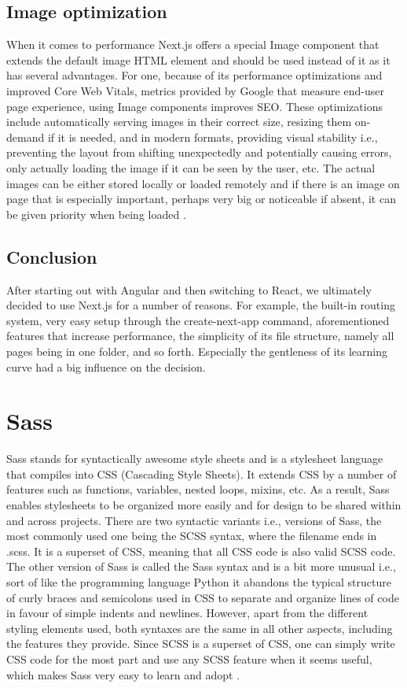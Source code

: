 \subsection{Image optimization}
When it comes to performance Next.js offers a special Image component that extends the default image HTML element and should be used instead of
it as it has several advantages. For one, because of its performance optimizations and improved Core Web Vitals, metrics provided by Google that
measure end-user page experience, using Image components improves SEO. These optimizations include automatically serving images in their correct
size, resizing them on-demand if it is needed, and in modern formats, providing visual stability i.e., preventing the layout from shifting unexpectedly
and potentially causing errors, only actually loading the image if it can be seen by the user, etc. The actual images can be either stored locally
or loaded remotely and if there is an image on page that is especially important, perhaps very big or noticeable if absent, it can be given priority
when being loaded \cite{NextjsImageOptimization}.

\subsection{Conclusion}
After starting out with Angular and then switching to React, we ultimately decided to use Next.js for a number of reasons. For example, the built-in
routing system, very easy setup through the create-next-app command, aforementioned features that increase performance, the simplicity of its
file structure, namely all pages being in one folder, and so forth. Especially the gentleness of its learning curve had a big influence on the decision.

\section{Sass}
Sass stands for syntactically awesome style sheets and is a stylesheet language that compiles into CSS (Cascading Style Sheets). It extends CSS by a number
of features such as functions, variables, nested loops, mixins, etc. As a result, Sass enables stylesheets to be organized more easily and for design
to be shared within and across projects. There are two syntactic variants i.e., versions of Sass, the most commonly used one being the SCSS syntax, where the
filename ends in .scss. It is a superset of CSS, meaning that all CSS code is also valid SCSS code. The other version of Sass is called the Sass syntax
and is a bit more unusual i.e., sort of like the programming language Python it abandons the typical structure of curly braces and semicolons used in CSS
to separate and organize lines of code in favour of simple indents and newlines. However, apart from the different styling elements used, both syntaxes
are the same in all other aspects, including the features they provide. Since SCSS is a superset of CSS, one can simply write CSS code for the most part
and use any SCSS feature when it seems useful, which makes Sass very easy to learn and adopt \cite{SassFeatures}.

